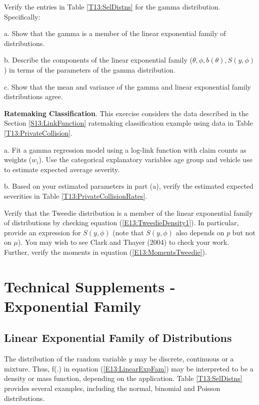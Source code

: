 \begin{exercises}


\item Verify the entries in Table \ref{T13:SelDistns} for the gamma
distribution. Specifically:

a. Show that the gamma is a member of the linear exponential family
of distributions.

b. Describe the components of the linear exponential family ($
\theta, \phi, b(\theta), S(y,\phi)$) in terms of the parameters of
the gamma distribution.

c. Show that the mean and variance of the gamma and linear
exponential family distributions agree.


\item \textbf{Ratemaking Classification}. This exercise considers the
data described in the Section \ref{S13:LinkFunction} ratemaking
classification example using data in Table
\ref{T13:PrivateCollision}.

a. Fit a gamma regression model using a log-link function with claim
counts as weights ($w_i$). Use the categorical explanatory variables
age group and vehicle use to estimate expected average severity.

b. Based on your estimated parameters in part (a), verify the
estimated expected severities in Table
\ref{T13:PrivateCollisionRates}.

\item Verify that the Tweedie distribution is a member of the linear exponential family
of distributions by checking equation (\ref{E13:TweedieDensity1}).
In particular, provide an expression for $S(y,\phi)$ (note that
$S(y,\phi)$ also depends on $p$ but not on $\mu$). You may wish to
see Clark and Thayer (2004) to check your work. Further, verify the
moments in equation (\ref{E13:MomentsTweedie}).




\end{exercises}


\section{Technical Supplements - Exponential Family}

\subsection{Linear Exponential Family of Distributions}
The distribution of the random variable $y$ may be discrete,
continuous or a mixture. Thus, f(.) in equation
(\ref{E13:LinearExpFam}) may be interpreted to be a density or mass
function, depending on the application. Table \ref{T13:SelDistns}
provides several examples, including the normal, binomial and
Poisson distributions.


